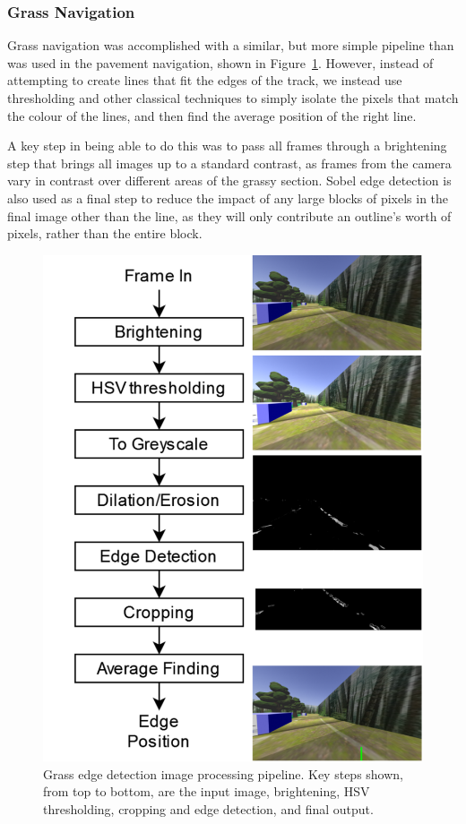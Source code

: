 \documentclass[titlepage, twocolumn]{article}
\begin{document}
        \subsubsection{Grass Navigation}

            Grass navigation was accomplished with a similar, but more simple pipeline than was used in the pavement navigation, shown in Figure~\ref{fig:grasspipeline}. However, instead of attempting to create lines that fit the edges of the track, we instead use thresholding and other classical techniques to simply isolate the pixels that match the colour of the lines, and then find the average position of the right line. 
            
            A key step in being able to do this was to pass all frames through a brightening step that brings all images up to a standard contrast, as frames from the camera vary in contrast over different areas of the grassy section. Sobel edge detection is also used as a final step to reduce the impact of any large blocks of pixels in the final image other than the line, as they will only contribute an outline's worth of pixels, rather than the entire block. 

            \begin{figure}
                \begin{center}
                    \includegraphics[width=0.5\linewidth]{grass-photos.png}
                \end{center}
                \caption{Grass edge detection image processing pipeline. Key steps shown, from top to bottom, are the input image, brightening, HSV thresholding, cropping and edge detection, and final output.}
                \label{fig:grasspipeline}
            \end{figure}
\end{document}
